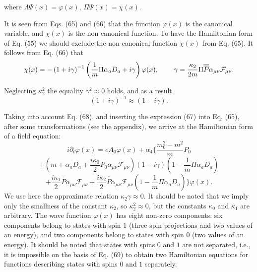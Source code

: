 \documentclass[a4paper,12pt]{article}
\begin{document}
where $\Lambda \Psi (x)=\varphi (x)$, $\Pi \Psi (x)=\chi (x)$.

It is seen from Eqs. (65) and (66) that the function $\varphi (x)$
is the canonical variable, and $\chi (x)$ is the non-canonical
function. To have the Hamiltonian form of Eq. (55) we should
exclude the non-canonical function $\chi (x)$ from Eq. (65). It
follows from Eq. (66) that
\begin{equation}
\chi (x)=-\left( 1+i\gamma \right) ^{-1}\left( \frac 1m\Pi \alpha
_aD_a+i\gamma \right) \varphi (x),\hspace{0.3in}\gamma
=\frac{\kappa _2}{2m} \Pi \overline{\overline{P}}\alpha _{\mu \nu
}\mathcal{F}_{\mu \nu }. \label{67}
\end{equation}

Neglecting $\kappa_2^2$ the equality $\gamma^2\approx 0$ holds,
and as a result
\begin{equation}
\left( 1+i\gamma \right) ^{-1}\approx\left( 1-i\gamma \right).
\label{68}
\end{equation}

Taking into account Eq. (68), and inserting the expression (67)
into Eq. (65), after some transformations (see the appendix), we
arrive at the Hamiltonian form of a field equation:
\[
i\partial_t\varphi(x)=eA_0\varphi(x)+\alpha_4\biggl\{\frac{m_0^2-m^2}
{m}P_0
\]
\begin{equation}
+\left(m+\alpha _aD_a+\frac{i\kappa_0}{2} P_0\alpha_{\mu \nu
}\mathcal{F}_{\mu \nu }\right)\left( 1-i\gamma \right)\left(1
-\frac{1}{m}\Pi \alpha_aD_a\right)
\end{equation}\label{69}
\[
+\frac{i\kappa_1}2 \overline{P}\alpha _{\mu \nu }\mathcal{F}_{\mu
\nu }+\frac{i\kappa_2}{2}\overline{\overline{P}}\alpha _{\mu \nu
}\mathcal{F}_{\mu \nu }\left( 1-\frac 1m\Pi \alpha _aD_a\right)
\biggr \}\varphi (x).
\]
We use here the approximate relation $\kappa_2\gamma\approx0$. It
should be noted that we imply only the smallness of the constant
$\kappa_2$, so $\kappa^2_2\approx0$, but the constants $\kappa_0$
and $\kappa_1$ are arbitrary. The wave function $\varphi (x)$ has
eight non-zero components: six components belong to states with
spin $1$ (three spin projections and two values of an energy), and
two components belong to states with spin $0$ (two values of an
energy). It should be noted that states with spins $0$ and $1$ are
not separated, i.e., it is impossible on the basis of Eq. (69) to
obtain two Hamiltonian equations for functions describing states
with spins $0$ and $1$ separately.
\end{document}
